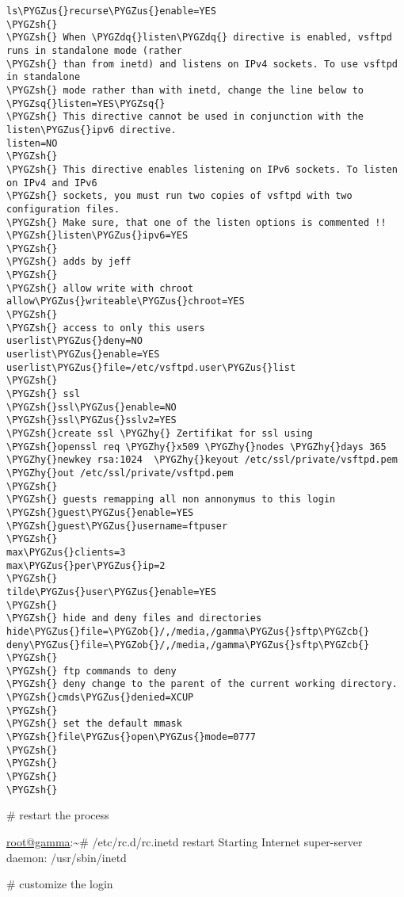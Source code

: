 \documentclass[letterpaper,10pt,english]{sphinxmanual}
\def\PYGZus{\char`\_}
\def\PYGZob{\char`\{}
\def\PYGZcb{\char`\}}
\def\PYGZsh{\char`\#}
\def\PYGZhy{\char`\-}
\def\PYGZsq{\char`\'}
\def\PYGZdq{\char`\"}
\begin{document}
\begin{Verbatim}[commandchars=\\\{\}]
ls\PYGZus{}recurse\PYGZus{}enable=YES
\PYGZsh{}
\PYGZsh{} When \PYGZdq{}listen\PYGZdq{} directive is enabled, vsftpd runs in standalone mode (rather
\PYGZsh{} than from inetd) and listens on IPv4 sockets. To use vsftpd in standalone
\PYGZsh{} mode rather than with inetd, change the line below to \PYGZsq{}listen=YES\PYGZsq{}
\PYGZsh{} This directive cannot be used in conjunction with the listen\PYGZus{}ipv6 directive.
listen=NO
\PYGZsh{}
\PYGZsh{} This directive enables listening on IPv6 sockets. To listen on IPv4 and IPv6
\PYGZsh{} sockets, you must run two copies of vsftpd with two configuration files.
\PYGZsh{} Make sure, that one of the listen options is commented !!
\PYGZsh{}listen\PYGZus{}ipv6=YES
\PYGZsh{}
\PYGZsh{} adds by jeff
\PYGZsh{}
\PYGZsh{} allow write with chroot
allow\PYGZus{}writeable\PYGZus{}chroot=YES
\PYGZsh{}
\PYGZsh{} access to only this users
userlist\PYGZus{}deny=NO
userlist\PYGZus{}enable=YES
userlist\PYGZus{}file=/etc/vsftpd.user\PYGZus{}list
\PYGZsh{}
\PYGZsh{} ssl
\PYGZsh{}ssl\PYGZus{}enable=NO
\PYGZsh{}ssl\PYGZus{}sslv2=YES
\PYGZsh{}create ssl \PYGZhy{} Zertifikat for ssl using
\PYGZsh{}openssl req \PYGZhy{}x509 \PYGZhy{}nodes \PYGZhy{}days 365 \PYGZhy{}newkey rsa:1024  \PYGZhy{}keyout /etc/ssl/private/vsftpd.pem \PYGZhy{}out /etc/ssl/private/vsftpd.pem
\PYGZsh{}
\PYGZsh{} guests remapping all non annonymus to this login
\PYGZsh{}guest\PYGZus{}enable=YES
\PYGZsh{}guest\PYGZus{}username=ftpuser
\PYGZsh{}
max\PYGZus{}clients=3
max\PYGZus{}per\PYGZus{}ip=2
\PYGZsh{}
tilde\PYGZus{}user\PYGZus{}enable=YES
\PYGZsh{}
\PYGZsh{} hide and deny files and directories
hide\PYGZus{}file=\PYGZob{}/,/media,/gamma\PYGZus{}sftp\PYGZcb{} 
deny\PYGZus{}file=\PYGZob{}/,/media,/gamma\PYGZus{}sftp\PYGZcb{} 
\PYGZsh{}
\PYGZsh{} ftp commands to deny 
\PYGZsh{} deny change to the parent of the current working directory.
\PYGZsh{}cmds\PYGZus{}denied=XCUP
\PYGZsh{}
\PYGZsh{} set the default mmask
\PYGZsh{}file\PYGZus{}open\PYGZus{}mode=0777
\PYGZsh{}
\PYGZsh{}
\PYGZsh{}
\PYGZsh{}
\end{Verbatim}

\# restart the process

\href{mailto:root@gamma}{root@gamma}:\textasciitilde{}\# /etc/rc.d/rc.inetd restart
Starting Internet super-server daemon:  /usr/sbin/inetd

\# customize the login
\end{document}
